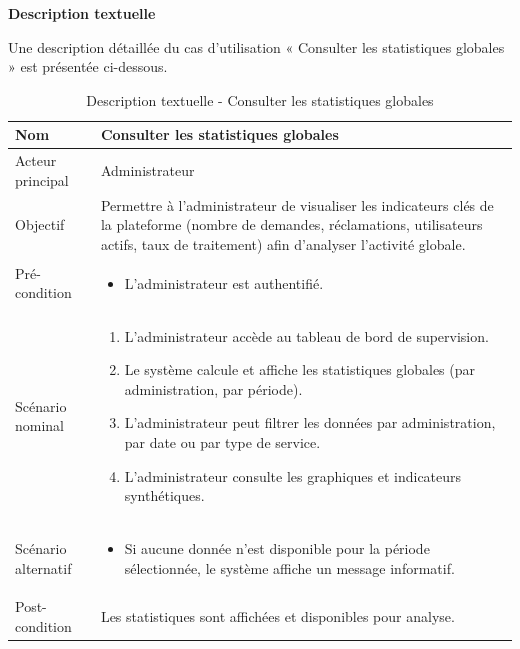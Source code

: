 \textbf{Description textuelle}

Une description détaillée du cas d'utilisation « Consulter les statistiques globales » est présentée ci-dessous.

\begin{table}[H]
\centering
\begin{tabular}{ |p{4cm}|p{12cm}|} \hline

Nom & Consulter les statistiques globales \\ \hline

Acteur principal & Administrateur \\ \hline

Objectif & Permettre à l'administrateur de visualiser les indicateurs clés de la plateforme (nombre de demandes, réclamations, utilisateurs actifs, taux de traitement) afin d'analyser l'activité globale. \\ \hline

Pré-condition &
\begin{itemize}
    \item L'administrateur est authentifié.
\end{itemize}
\\ \hline

Scénario nominal &
\begin{enumerate}
    \item L'administrateur accède au tableau de bord de supervision.
    \item Le système calcule et affiche les statistiques globales (par administration, par période).
    \item L'administrateur peut filtrer les données par administration, par date ou par type de service.
    \item L'administrateur consulte les graphiques et indicateurs synthétiques.
\end{enumerate}
\\ \hline

Scénario alternatif &
\begin{itemize}
    \item Si aucune donnée n'est disponible pour la période sélectionnée, le système affiche un message informatif.
\end{itemize}
\\ \hline

Post-condition &
Les statistiques sont affichées et disponibles pour analyse. \\ \hline

\end{tabular}
\caption{Description textuelle - Consulter les statistiques globales}
\label{tab:statistiques-globales}
\end{table}


